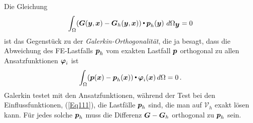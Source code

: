 {\begin{remark}
Die Gleichung
\begin{align}\label{Eq111}
\int_{\Omega} (\mbox{\boldmath $G$}(\mbox{\boldmath $y$},\mbox{\boldmath $x$}) - \mbox{\boldmath $G$}_h(\mbox{\boldmath $y$},\mbox{\boldmath $x$})){\,\scriptscriptstyle \stackrel{\bullet}{{}}}\, \mbox{\boldmath $p$}_h(\mbox{\boldmath $y$})\,\,d\Omega_{\mbox{\boldmath $y$}} = 0
\end{align}
ist das Gegenst\"{u}ck zu der {\em Galerkin-Orthogonalit\"{a}t\/}, die ja besagt, dass die Abweichung des FE-Lastfalls $\mbox{\boldmath $p$}_h$ vom exakten Lastfall $\mbox{\boldmath $p$}$ orthogonal zu allen Ansatzfunktionen $\mbox{\boldmath $\varphi$}_i$ ist
\begin{align}
\int_{\Omega} (\mbox{\boldmath $p$}(\mbox{\boldmath $x$}) - \mbox{\boldmath $p$}_h(\mbox{\boldmath $x$})){\,\scriptscriptstyle \stackrel{\bullet}{{}}}\, \mbox{\boldmath $\varphi$}_i(\mbox{\boldmath $x$})\,d\Omega = 0\,.
\end{align}
Galerkin testet mit den Ansatzfunktionen, w\"{a}hrend der Test bei den Einflussfunktionen, (\ref{Eq111}), die Lastf\"{a}lle $\mbox{\boldmath $p$}_h$ sind, die man auf $\mathcal{V}_h$ exakt l\"{o}sen kann. F\"{u}r jedes solche $\mbox{\boldmath $p$}_h$ muss  die Differenz $\mbox{\boldmath $G$} - \mbox{\boldmath $G$}_h$ orthogonal zu $\mbox{\boldmath $p$}_h$ sein.


\end{remark}}
